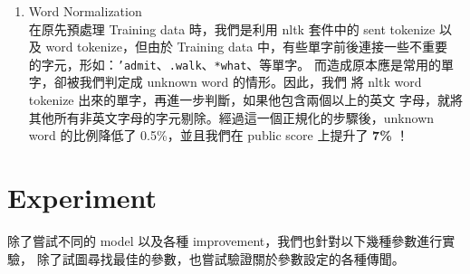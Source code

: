 \documentclass[12pt, a4paper]{article}
\theoremstyle{mystyle}	%
\begin{document}
\begin{enumerate}
  \item Word Normalization\\
    在原先預處理 Training data 時，我們是利用 nltk 套件中的 sent tokenize
    以及 word tokenize，但由於 Training data 中，有些單字前後連接一些不重要
    的字元，形如：\texttt{'admit}、\texttt{.walk}、\texttt{*what}、等單字。
    而造成原本應是常用的單字，卻被我們判定成 unknown word 的情形。因此，我們
    將 nltk word tokenize 出來的單字，再進一步判斷，如果他包含兩個以上的英文
    字母，就將其他所有非英文字母的字元剔除。經過這一個正規化的步驟後，unknown
    word 的比例降低了 0.5\%，並且我們在 public score 上提升了 \textbf{7\%} ！
\end{enumerate}

\section{Experiment}
除了嘗試不同的 model 以及各種 improvement，我們也針對以下幾種參數進行實驗，
除了試圖尋找最佳的參數，也嘗試驗證關於參數設定的各種傳聞。
\end{document}
